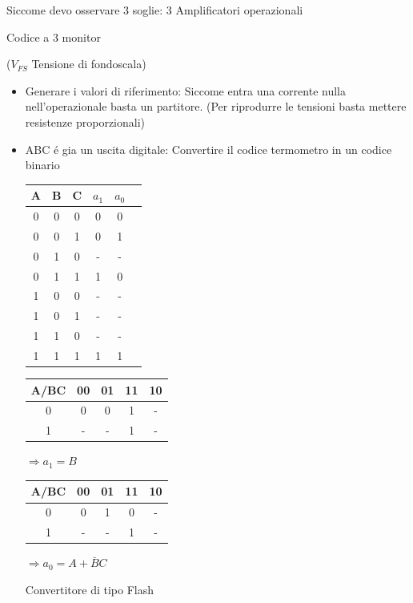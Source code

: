 \documentclass{article}
\begin{document}
Siccome devo osservare 3 soglie: 3 Amplificatori operazionali

\begin{circuitikz}

\end{circuitikz}
Codice a 3 monitor

($V_{FS}$ Tensione di fondoscala)

\begin{itemize}
    \item Generare i valori di riferimento:
        Siccome entra una corrente nulla nell'operazionale basta un partitore. (Per riprodurre le tensioni basta mettere resistenze proporzionali)
    \item ABC \'e gia un uscita digitale: Convertire il codice termometro in un codice binario

        \begin{minipage}{0.3\textwidth}
            \begin{tabular}{c c c|c c c }
                A & B & C & $a_1$ & $a_0$\\
                \hline
                0 & 0 & 0 & 0 & 0\\
                0 & 0 & 1 & 0 & 1\\
                0 & 1 & 0 & - & -\\
                0 & 1 & 1 & 1 & 0\\
                1 & 0 & 0 & - & -\\
                1 & 0 & 1 & - & -\\
                1 & 1 & 0 & - & -\\
                1 & 1 & 1 & 1 & 1\\
            \end{tabular}
        \end{minipage}
        \begin{minipage}{0.6\textwidth}
        \begin{tabular}{c|c|c|c|c|}
            A/BC & 00 & 01 & 11 & 10\\
            \hline
            0 & 0 & 0& 1 & -\\
            \hline
            1 & - & - & 1 & -\\
            \hline
        \end{tabular} $\Rightarrow a_1 = B$
        \bigbreak
        \begin{tabular}{c|c|c|c|c|}
            A/BC & 00 & 01 & 11 & 10\\
            \hline
            0 & 0 & 1& 0 & -\\
            \hline
            1 & - & - & 1 & -\\
            \hline
        \end{tabular} $\Rightarrow a_0 = A + \bar{B}C$
        \end{minipage}

        Convertitore di tipo Flash
\end{itemize}
\end{document}
